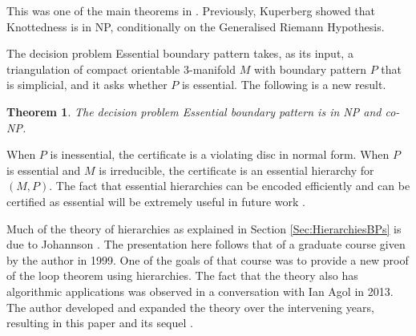\documentclass[oneside]{amsart}
\numberwithin{equation}{section}
\theoremstyle{plain}
\newtheorem{theorem}[equation]{Theorem}
\theoremstyle{definition}
\begin{document}
This was one of the main theorems in \cite{Lackenby:EfficientCertification}. Previously, Kuperberg \cite{Kuperberg:Knottedness}
showed that {\sc Knottedness} is in NP, conditionally on the Generalised Riemann Hypothesis.

The decision problem {\sc Essential boundary pattern} takes, as its input, a triangulation of compact orientable
3-manifold $M$ with boundary pattern $P$ that is simplicial, and it asks whether $P$ is essential.
The following is a new result.

\begin{theorem} 
\label{Thm:EssentialNPcoNP}
The decision problem {\sc Essential boundary pattern} is in NP and co-NP.
\end{theorem}

When $P$ is inessential, the certificate is a violating disc in normal form. When $P$ is essential and $M$ is irreducible,
the certificate is an essential hierarchy for $(M,P)$. The fact that essential hierarchies can be encoded efficiently
and can be certified as essential will be extremely useful in future work \cite{Lackenby:LinkHyperbolicity}.

Much of the theory of hierarchies as explained in Section \ref{Sec:HierarchiesBPs} is due to Johannson \cite{Johannson}. The presentation here
follows that of a graduate course  \cite{Lackenby:Notes} given by the author in 1999. One of the goals of that course was to provide a new proof of the loop theorem using hierarchies. The fact that the theory also has algorithmic applications was observed in a conversation with Ian Agol in 2013. The author developed and expanded the theory over the intervening years, resulting in this paper and its sequel \cite{Lackenby:LinkHyperbolicity}.
\end{document}
